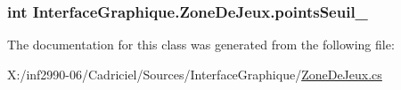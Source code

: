 \hypertarget{class_interface_graphique_1_1_zone_de_jeux_a4bdf50cae9be7a36862922813590feaa}{
\subsubsection[{points\-Seuil\-\_\-}]{\setlength{\rightskip}{0pt plus 5cm}int Interface\-Graphique.\-Zone\-De\-Jeux.\-points\-Seuil\-\_\-}}\label{class_interface_graphique_1_1_zone_de_jeux_a4bdf50cae9be7a36862922813590feaa}


The documentation for this class was generated from the following file\-:\begin{DoxyCompactItemize}
\item 
X\-:/inf2990-\/06/\-Cadriciel/\-Sources/\-Interface\-Graphique/\hyperlink{_zone_de_jeux_8cs}{Zone\-De\-Jeux.\-cs}\end{DoxyCompactItemize}
